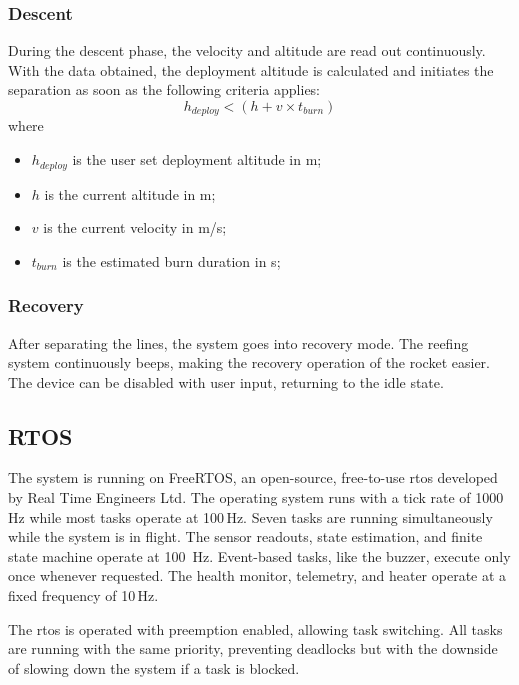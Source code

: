 \subsubsection{Descent}
During the descent phase, the velocity and altitude are read out continuously. With the data obtained, the deployment altitude is calculated and initiates the separation as soon as the following criteria applies:
\begin{equation}
    h_{deploy} < (h + v \times t_{burn}) 
\end{equation}
where
\begin{itemize}
    \item $h_{deploy}$ is the user set deployment altitude in m;
    \item $h$ is the current altitude in m;
    \item $v$ is the current velocity in m/s;
    \item $t_{burn}$ is the estimated burn duration in s;
\end{itemize}

\subsubsection{Recovery}
After separating the lines, the system goes into recovery mode. The reefing system continuously beeps, making the recovery operation of the rocket easier. The device can be disabled with user input, returning to the idle state.

\newpage

\subsection{RTOS}
The system is running on FreeRTOS, an open-source, free-to-use \acrlong{rtos} developed by Real Time Engineers Ltd. The operating system runs with a tick rate of 1000\,Hz while most tasks operate at 100\,Hz. Seven tasks are running simultaneously while the system is in flight. The sensor readouts, state estimation, and finite state machine operate at 100\ Hz. Event-based tasks, like the buzzer, execute only once whenever requested. The health monitor, telemetry, and heater operate at a fixed frequency of 10\,Hz.

The \acrshort{rtos} is operated with preemption enabled, allowing task switching. All tasks are running with the same priority, preventing deadlocks but with the downside of slowing down the system if a task is blocked.   


